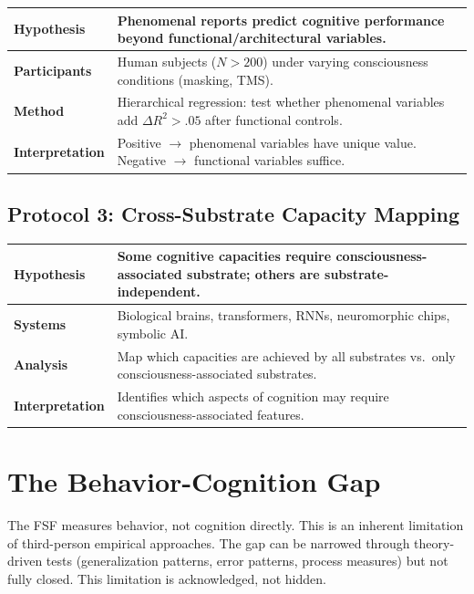 \documentclass[12pt,a4paper]{article}
\begin{document}
\begin{longtable}{>{\raggedright\arraybackslash}p{}>{\raggedright\arraybackslash}p{}}
\toprule
\textbf{Hypothesis} & Phenomenal reports predict cognitive performance beyond functional/architectural variables. \\
\midrule
\textbf{Participants} & Human subjects ($N > 200$) under varying consciousness conditions (masking, TMS). \\
\midrule
\textbf{Method} & Hierarchical regression: test whether phenomenal variables add $\Delta R^2 > .05$ after functional controls. \\
\midrule
\textbf{Interpretation} & Positive $\rightarrow$ phenomenal variables have unique value. Negative $\rightarrow$ functional variables suffice. \\
\bottomrule
\end{longtable}

\subsection*{Protocol 3: Cross-Substrate Capacity Mapping}

\begin{longtable}{>{\raggedright\arraybackslash}p{}>{\raggedright\arraybackslash}p{}}
\toprule
\textbf{Hypothesis} & Some cognitive capacities require consciousness-associated substrate; others are substrate-independent. \\
\midrule
\textbf{Systems} & Biological brains, transformers, RNNs, neuromorphic chips, symbolic AI. \\
\midrule
\textbf{Analysis} & Map which capacities are achieved by all substrates vs.\ only consciousness-associated substrates. \\
\midrule
\textbf{Interpretation} & Identifies which aspects of cognition may require consciousness-associated features. \\
\bottomrule
\end{longtable}

\section{The Behavior-Cognition Gap}

The FSF measures behavior, not cognition directly. This is an inherent limitation of third-person empirical approaches. The gap can be narrowed through theory-driven tests (generalization patterns, error patterns, process measures) but not fully closed. This limitation is acknowledged, not hidden.
\end{document}
